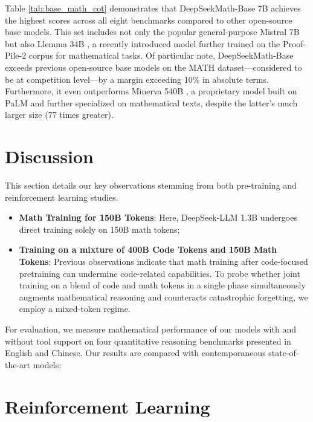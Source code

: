 Table \ref{tab:base_math_cot} demonstrates that DeepSeekMath-Base 7B achieves the highest scores across all eight benchmarks compared to other open-source base models. This set includes not only the popular general-purpose Mistral 7B \citep{mistral} but also Llemma 34B \citep{llemma}, a recently introduced model further trained on the Proof-Pile-2 corpus \citep{llemma} for mathematical tasks. Of particular note, DeepSeekMath-Base exceeds previous open-source base models on the MATH dataset—considered to be at competition level—by a margin exceeding 10\% in absolute terms. Furthermore, it even outperforms Minerva 540B \citep{minerva}, a proprietary model built on PaLM \citep{palm} and further specialized on mathematical texts, despite the latter’s much larger size (77 times greater).

\section{Discussion}
This section details our key observations stemming from both pre-training and reinforcement learning studies.

\begin{itemize}[topsep=0pt]
    \item \textbf{Math Training for 150B Tokens}: Here, DeepSeek-LLM 1.3B undergoes direct training solely on 150B math tokens;
    \item \textbf{Training on a mixture of 400B Code Tokens and 150B Math Tokens}: Previous observations indicate that math training after code-focused pretraining can undermine code-related capabilities. To probe whether joint training on a blend of code and math tokens in a single phase simultaneously augments mathematical reasoning and counteracts catastrophic forgetting, we employ a mixed-token regime.
\end{itemize}

For evaluation, we measure mathematical performance of our models with and without tool support on four quantitative reasoning benchmarks presented in English and Chinese. Our results are compared with contemporaneous state-of-the-art models:

\section{Reinforcement Learning}

